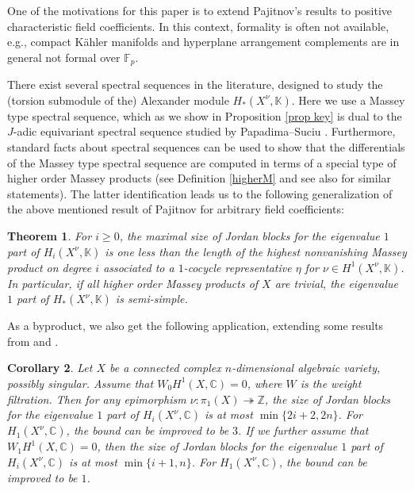 \documentclass[12pt,leqno,twoside]{amsart}
\theoremstyle{plain}
\newtheorem{theorem}{Theorem}[section]
\newtheorem{cor}[theorem]{Corollary}
\theoremstyle{definition}
\def\bc{\begin{cor}}
\def\ec{\end{cor}}
\newcommand{\C}{\mathbb{C}}
\newcommand{\Z}{\mathbb{Z}}
\newcommand{\K}{\mathbb{K}}
\newcommand{\F}{\mathbb{F}}
\begin{document}
One of the motivations for this paper is to extend Pajitnov's results  \cite{Paj17} to positive characteristic field coefficients. In this context, formality is often not available, e.g., compact K\"ahler manifolds \cite{Eke} and hyperplane arrangement complements \cite{Mat} are in general not formal over $\F_p$. 

There exist several spectral sequences in the literature, designed to study the (torsion submodule of the) Alexander module $H_*(X^\nu,\K)$. Here we use 
a Massey type spectral sequence, which as we show in Proposition \ref{prop key} is dual to the $J$-adic equivariant spectral sequence studied by Papadima--Suciu \cite{PS10}. Furthermore, standard facts about spectral sequences can be used to show that the differentials of the Massey type spectral sequence are computed in terms of a special type of higher order Massey products (see Definition \ref{higherM}  and see also \cite{KP,Paj17,Paj19} for similar statements).
The latter identification leads us to the following generalization of the above mentioned result of Pajitnov  \cite[Theorem 5.1]{Paj17} for arbitrary field coefficients:   
\begin{theorem} \label{thm main}
For $i\geq 0$, the maximal size of Jordan blocks for the eigenvalue $1$ part of $H_i(X^\nu,\K)$ is one less than the length of the highest nonvanishing  Massey product {on degree $i$} associated to a $1$-cocycle representative $\eta$ for $\nu \in H^1(X^\nu,\K)$.
    In particular, if all higher order Massey products of $X$ are trivial, the eigenvalue $1$ part of $H_*(X^\nu,\K)$ is semi-simple.
\end{theorem}

As a byproduct, we also get the following application, extending some results from \cite{Memoir} and \cite{BR}. 
\bc \label{cor singular}  Let $X$ be a connected complex $n$-dimensional algebraic variety, possibly singular. Assume that $W_0 H^1(X,\C)=0$, where $W$ is the weight filtration. Then for any epimorphism $\nu \colon \pi_1(X)\twoheadrightarrow \Z$, the size of Jordan blocks for the eigenvalue $1$ part of $H_i(X^\nu,\C)$ is at most $ \min\{2i+2,2n\}$. For $H_1(X^\nu,\C)$, the bound can be improved to be  $ 3$. 
If we further assume that $W_1 H^1(X,\C)=0$, then the size of Jordan blocks for the eigenvalue $1$ part of $H_i(X^\nu,\C)$ is at most $ \min\{i+1,n\}$. For $H_1(X^\nu,\C)$, the bound can be improved to be $1$. \ec
\end{document}
